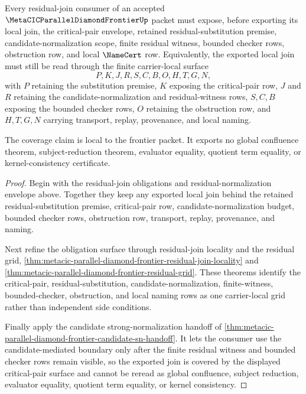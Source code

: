\begin{theorem}
\label{thm:metacic-parallel-diamond-frontier-residual-critical-pair-coverage}
Every residual-join consumer of an accepted $\MetaCICParallelDiamondFrontierUp$ packet must expose, before exporting its local join, the critical-pair envelope, retained residual-substitution premise, candidate-normalization scope, finite residual witness, bounded checker rows, obstruction row, and local $\NameCert$ row. Equivalently, the exported local join must still be read through the finite carrier-local surface
$$
P,K,J,R,S,C,B,O,H,T,G,N ,
$$
with $P$ retaining the substitution premise, $K$ exposing the critical-pair row, $J$ and $R$ retaining the candidate-normalization and residual-witness rows, $S,C,B$ exposing the bounded checker rows, $O$ retaining the obstruction row, and $H,T,G,N$ carrying transport, replay, provenance, and local naming.

The coverage claim is local to the frontier packet. It exports no global confluence theorem, subject-reduction theorem, evaluator equality, quotient term equality, or kernel-consistency certificate.
\end{theorem}
\begin{proof}
Begin with the residual-join obligations and residual-normalization envelope above. Together they keep any exported local join behind the retained residual-substitution premise, critical-pair row, candidate-normalization budget, bounded checker rows, obstruction row, transport, replay, provenance, and naming.

Next refine the obligation surface through residual-join locality and the residual grid, \autoref{thm:metacic-parallel-diamond-frontier-residual-join-locality} and \autoref{thm:metacic-parallel-diamond-frontier-residual-grid}. These theorems identify the critical-pair, residual-substitution, candidate-normalization, finite-witness, bounded-checker, obstruction, and local naming rows as one carrier-local grid rather than independent side conditions.

Finally apply the candidate strong-normalization handoff of \autoref{thm:metacic-parallel-diamond-frontier-candidate-sn-handoff}. It lets the consumer use the candidate-mediated boundary only after the finite residual witness and bounded checker rows remain visible, so the exported join is covered by the displayed critical-pair surface and cannot be reread as global confluence, subject reduction, evaluator equality, quotient term equality, or kernel consistency.
\end{proof}

